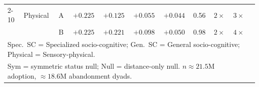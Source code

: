\begin{table}[H]
\begin{tabular}{llcrrrrrrrr}
\cmidrule(lr){2-10}
 & Physical   & A & $+0.225$ & $+0.125$ & $+0.055$ & $+0.044$ & 0.56 & $2\times$ & $3\times$ \\
 &            & B & $+0.225$ & $+0.221$ & $+0.098$ & $+0.050$ & 0.98 & $2\times$ & $4\times$ \\
\bottomrule
\multicolumn{10}{l}{\footnotesize Spec.~SC = Specialized socio-cognitive; Gen.~SC = General socio-cognitive; Physical = Sensory-physical.} \\
\multicolumn{10}{l}{\footnotesize Sym = symmetric status null; Null = distance-only null. $n \approx 21.5$M adoption, $\approx 18.6$M abandonment dyads.}
\end{tabular}
\end{table}
